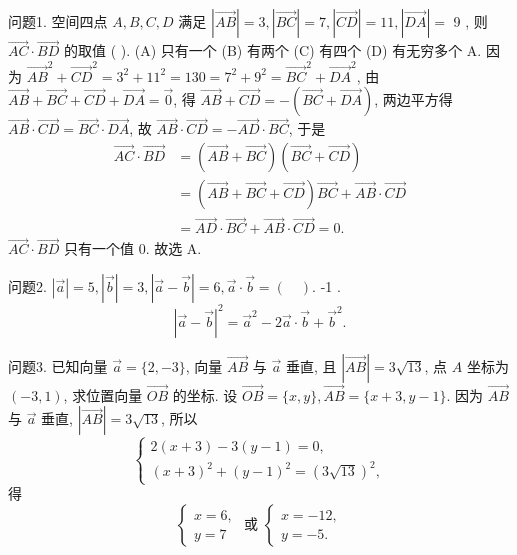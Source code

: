 
问题1. 空间四点 $A, B, C, D$ 满足 $|\overrightarrow{A B}|=3,|\overrightarrow{B C}|=7,|\overrightarrow{C D}|=11,|\overrightarrow{D A}|=$ 9 , 则 $\overrightarrow{A C} \cdot \overrightarrow{B D}$ 的取值 ( ).
(A) 只有一个
(B) 有两个
(C) 有四个
(D) 有无穷多个
A.
因为 $\overrightarrow{A B}^2+\overrightarrow{C D}^2=3^2+11^2=130=7^2+9^2=\overrightarrow{B C}^2+\overrightarrow{D A}^2$, 由 $\overrightarrow{A B}+\overrightarrow{B C}+ \overrightarrow{C D}+\overrightarrow{D A}=\overrightarrow{0}$, 得 $\overrightarrow{A B}+\overrightarrow{C D}=-(\overrightarrow{B C}+\overrightarrow{D A})$, 两边平方得 $\overrightarrow{A B} \cdot \overrightarrow{C D}=\overrightarrow{B C} \cdot \overrightarrow{D A}$, 故 $\overrightarrow{A B} \cdot \overrightarrow{C D}=-\overrightarrow{A D} \cdot \overrightarrow{B C}$, 于是
$$
\begin{aligned}
\overrightarrow{A C} \cdot \overrightarrow{B D} & =(\overrightarrow{A B}+\overrightarrow{B C})(\overrightarrow{B C}+\overrightarrow{C D}) \\
& =(\overrightarrow{A B}+\overrightarrow{B C}+\overrightarrow{C D}) \overrightarrow{B C}+\overrightarrow{A B} \cdot \overrightarrow{C D} \\
& =\overrightarrow{A D} \cdot \overrightarrow{B C}+\overrightarrow{A B} \cdot \overrightarrow{C D}=0 .
\end{aligned}
$$
$\overrightarrow{A C} \cdot \overrightarrow{B D}$ 只有一个值 0. 故选 A.



问题2. $|\vec{a}|=5,|\vec{b}|=3,|\vec{a}-\vec{b}|=6, \vec{a} \cdot \vec{b}=(\quad)$.
-1 .
$$
|\vec{a}-\vec{b}|^2=\vec{a}^2-2 \vec{a} \cdot \vec{b}+\vec{b}^2 .
$$



问题3. 已知向量 $\vec{a}=\{2,-3\}$, 向量 $\overrightarrow{A B}$ 与 $\vec{a}$ 垂直, 且 $|\overrightarrow{A B}|=3 \sqrt{13}$, 点 $A$ 坐标为 $(-3,1)$, 求位置向量 $\overrightarrow{O B}$ 的坐标.
设 $\overrightarrow{O B}=\{x, y\}, \overrightarrow{A B}=\{x+3, y-1\}$. 因为 $\overrightarrow{A B}$ 与 $\vec{a}$ 垂直, $|\overrightarrow{A B}|= 3 \sqrt{13}$, 所以
$$
\left\{\begin{array}{l}
2(x+3)-3(y-1)=0, \\
(x+3)^2+(y-1)^2=(3 \sqrt{13})^2,
\end{array}\right.
$$
得
$$
\left\{\begin{array} { l } 
{ x = 6 , } \\
{ y = 7 }
\end{array} \text { 或 } \left\{\begin{array}{l}
x=-12, \\
y=-5 .
\end{array}\right.\right.
$$



